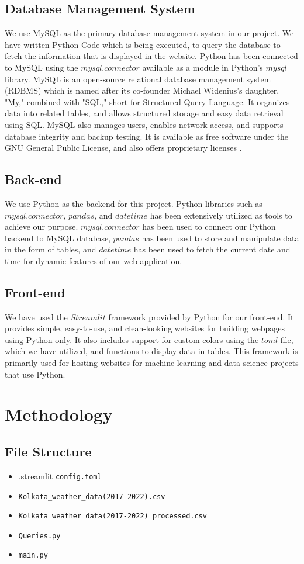 \documentclass[12pt, a4paper]{article}
\begin{document}
\subsection{Database Management System }
    We use MySQL as the primary database management system in our project. We have written Python Code which is being executed, to query the database to fetch the information that is displayed in the website. Python has been connected to MySQL using the $mysql.connector$ available as a module in Python's $mysql$ library. MySQL is an open-source relational database management system (RDBMS) which is named after its co-founder Michael Widenius's daughter, "My," combined with "SQL," short for Structured Query Language. It organizes data into related tables, and allows structured storage and easy data retrieval using SQL. MySQL also manages users, enables network access, and supports database integrity and backup testing. It is available as free software under the GNU General Public License, and also offers proprietary licenses \cite{wikipediaMySQLWikipedia}.
\subsection{Back-end} 
    We use Python as the backend for this project. Python libraries such as $mysql.connector$, $pandas$, and $datetime$ has been extensively utilized as tools to achieve our purpose. $mysql.connector$ has been used to connect our Python backend to MySQL database, $pandas$ has been used to store and manipulate data in the form of tables, and $datetime$ has been used to fetch the current date and time for dynamic features of our web application.
\subsection{Front-end}
    We have used the $Streamlit$ framework provided by Python for our front-end. It provides simple, easy-to-use, and clean-looking websites for building webpages using Python only. It also includes support for custom colors using the $toml$ file, which we have utilized, and functions to display data in tables. This framework is primarily used for hosting websites for machine learning and data science projects that use Python.
    
\newpage
\section{Methodology}
\subsection{File Structure}
\begin{itemize}
    \item {.streamlit}
        \subitem \texttt{config.toml}
    \item \texttt{Kolkata\_weather\_data(2017-2022).csv}
    \item \texttt{Kolkata\_weather\_data(2017-2022)\_processed.csv}
    \item \texttt{Queries.py}
    \item \texttt{main.py}\\
\end{itemize}
    
\end{document}
